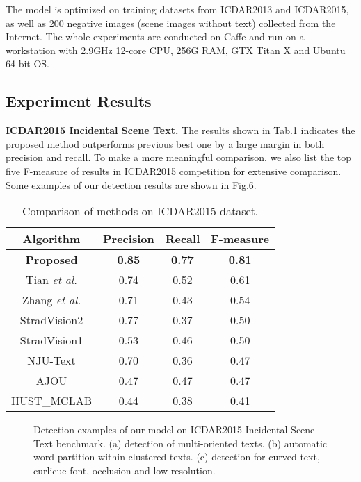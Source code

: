 \documentclass[10pt,twocolumn,letterpaper]{article}
\begin{document}
	The model is optimized on training datasets from ICDAR2013 and ICDAR2015, as well as 200 negative images (scene images without text) collected from the Internet. The whole experiments are conducted on Caffe and run on a workstation with 2.9GHz 12-core CPU, 256G RAM, GTX Titan X and Ubuntu 64-bit OS.
	
	\subsection{Experiment Results}
	\label{Sec.4.3}
	
	\noindent \textbf{ICDAR2015 Incidental Scene Text.} The results shown in Tab.\hyperref[Tab.1]{1} indicates the proposed method outperforms previous best one by a large margin in both precision and recall.
	To make a more meaningful comparison, we also list the top five F-measure of results in ICDAR2015 competition for extensive comparison. 
	Some examples of our detection results are shown in Fig.\hyperref[Fig.6]{6}.
	
	\begin{table}
		\label{Tab.1}
		\small
		\renewcommand\arraystretch{1.2}
		\centering
		\caption{Comparison of methods on ICDAR2015 dataset.}
		\begin{tabular}{|c|c|c|c|}
			\hline
			Algorithm & Precision & Recall & F-measure \\
			\hline
			\hline
			\textbf{Proposed} & \textbf{0.85} & \textbf{0.77} & \textbf{0.81} \\
			\hline
			Tian \emph{et al.} \cite{ctpn} & 0.74 & 0.52 & 0.61 \\
			\hline
			Zhang \emph{et al.} \cite{fcn-text} & 0.71 & 0.43 & 0.54 \\
			\hline
			StradVision2 \cite{karatzas2015icdar} & 0.77 & 0.37 & 0.50 \\
			\hline
			StradVision1 \cite{karatzas2015icdar} & 0.53 & 0.46 & 0.50 \\
			\hline
			NJU-Text \cite{karatzas2015icdar} & 0.70 & 0.36 & 0.47 \\
			\hline
			AJOU \cite{karatzas2015icdar} & 0.47 & 0.47 & 0.47 \\
			\hline
			HUST\_MCLAB  \cite{karatzas2015icdar} & 0.44 & 0.38 & 0.41 \\
			\hline
		\end{tabular}
	\end{table}
	
	\begin{figure}
		\label{Fig.6}
		\centering	
		\caption{Detection examples of our model on ICDAR2015 Incidental Scene Text benchmark. (a) detection of multi-oriented texts. (b) automatic word partition within clustered texts. (c) detection for curved text, curlicue font, occlusion and low resolution.}
	\end{figure}
	
\end{document}
